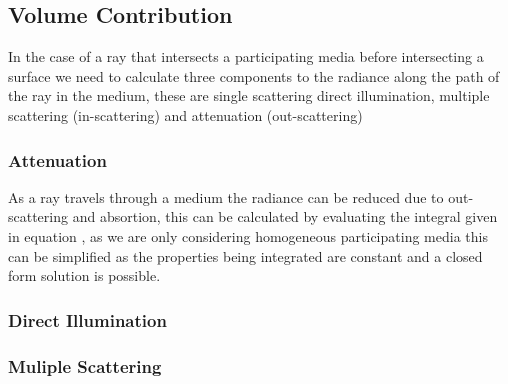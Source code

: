 \subsection{Volume Contribution}
In the case of a ray that intersects a participating media before intersecting a surface we need to calculate three components to
the radiance along the path of the ray in the medium, these are single scattering direct illumination, multiple scattering (in-scattering)
and attenuation (out-scattering)

\subsubsection{Attenuation}
As a ray travels through a medium the radiance can be reduced due to out-scattering and absortion, this can be calculated by evaluating
the integral given in equation , as we are only considering homogeneous participating media this can be
simplified as the properties being integrated are constant and a closed form solution is possible.


\subsubsection{Direct Illumination}
\subsubsection{Muliple Scattering}

